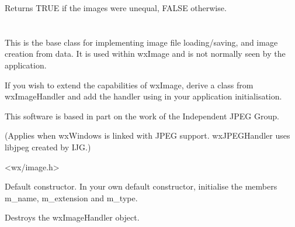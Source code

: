 


Returns TRUE if the images were unequal, FALSE otherwise.

\section{}\label{wximagehandler}

This is the base class for implementing image file loading/saving, and image creation from data.
It is used within wxImage and is not normally seen by the application.

If you wish to extend the capabilities of wxImage, derive a class from wxImageHandler
and add the handler using  in your
application initialisation.


This software is based in part on the work of the Independent JPEG Group.

(Applies when wxWindows is linked with JPEG support. wxJPEGHandler uses libjpeg
created by IJG.)




<wx/image.h>




\label{wximagehandlerconstr}


Default constructor. In your own default constructor, initialise the members
m\_name, m\_extension and m\_type.



Destroys the wxImageHandler object.



